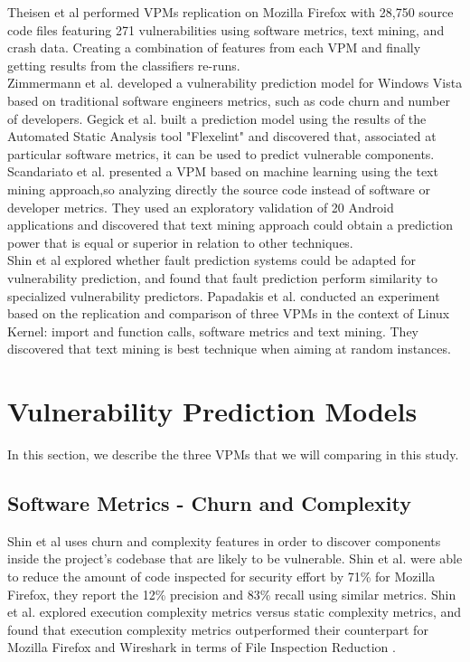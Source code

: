 \documentclass[twocolumn,10pt]{asme2ej}
\begin{document}
Theisen et al \cite{Theisen} performed VPMs replication on Mozilla Firefox with 28,750 source code files featuring 271 vulnerabilities using software metrics, text mining, and crash data.  Creating a combination of features from each VPM and finally getting results from the classifiers re-runs.\\
Zimmermann et al. \cite{Zimmermann} developed a vulnerability prediction model for Windows Vista based on traditional software engineers metrics, such as code churn and number of developers.
Gegick et al.\cite{Gegick} built a prediction model using the results of the Automated Static Analysis tool "Flexelint" and discovered that, associated at particular software metrics, it can be used to predict vulnerable components.\\
Scandariato et al.\cite{Scandariato} presented a VPM based on machine learning using the text mining approach,so analyzing directly the source code instead of software or developer metrics. They used an exploratory validation of 20 Android applications and discovered that text mining approach could obtain a prediction power that is equal or superior in relation to other techniques.\\
Shin et al \cite{Shin} explored whether fault prediction systems could be adapted for vulnerability prediction, and found that fault prediction perform similarity to specialized vulnerability predictors.
Papadakis et al. \cite{Papadakis} conducted an experiment based on the replication and comparison of three VPMs in the context of Linux Kernel: import and function calls, software metrics and text mining. They discovered that text mining is best technique when aiming at random instances.


\section{Vulnerability Prediction Models}
In this section, we describe the three VPMs that we will comparing in this study.\\
\subsection{Software Metrics - Churn and Complexity}
Shin et al \cite{Shin} uses churn and complexity features in order to discover components inside the project's codebase that are likely to be vulnerable. Shin et al. were able to reduce the amount of code inspected for security effort by 71\% for Mozilla Firefox, they report the 12\% precision and 83\% recall using similar metrics. Shin et al. explored execution complexity metrics versus static complexity metrics, and found that execution complexity metrics outperformed their counterpart for Mozilla Firefox and Wireshark in terms of File Inspection Reduction \cite{Shin_26}. 
\end{document}
